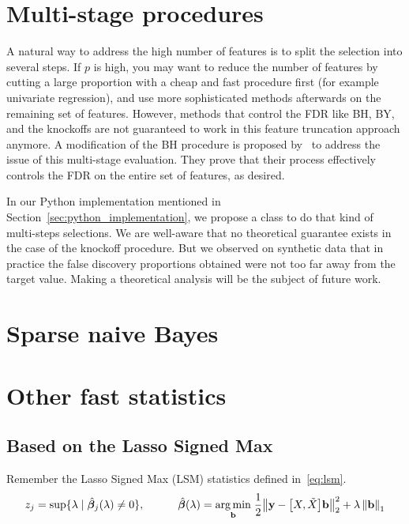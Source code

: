\section{Multi-stage procedures}\label{sec:multi_stage}

A natural way to address the high number of features is to split the selection into several steps.
If $p$ is high,
you may want to reduce the number of features by cutting a large proportion with a cheap and fast procedure first
(for example univariate regression),
and use more sophisticated methods afterwards on the remaining set of features.
However, methods that control the FDR like BH, BY, and the knockoffs are not guaranteed to work in this
feature truncation approach anymore.
A modification of the BH procedure is proposed by~\cite{multi_stage_fdr}
to address the issue of this multi-stage evaluation.
They prove that their process effectively controls the FDR on the entire set of features, as desired.

In our Python implementation mentioned in Section~\ref{sec:python_implementation},
we propose a  class to do that kind of multi-steps selections.
We are well-aware that no theoretical guarantee exists in the case of the knockoff procedure.
But we observed on synthetic data that in practice the false discovery proportions obtained
were not too far away from the target value.
Making a theoretical analysis will be the subject of future work.

\section{Sparse naive Bayes}\label{sec:snb}



\section{Other fast statistics}\label{sec:a}

\subsection{Based on the Lasso Signed Max}\label{subsec:based_on_lsm}

Remember the Lasso Signed Max (LSM) statistics defined in~\ref{eq:lsm}.
\begin{equation}\label{eq:lsm}
    z_j = \sup\{\lambda \mid \hat{\bm{\beta}}_j(\lambda) \neq 0\}
    ,\qquad\quad
    \hat{\bm{\beta}}(\lambda) =
    \underset{\mathbf{b}}{\operatorname*{arg\,min}}\;
    \frac{1}{2}\big\lVert \mathbf{y} - \big[ X, \tilde{X} \big]\mathbf{b} \big\rVert_2^2 + \lambda\left\lVert\mathbf{b}\right\rVert_1
\end{equation}

